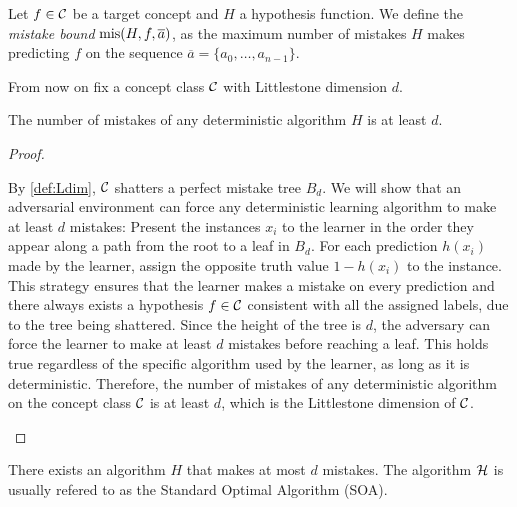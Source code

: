 \begin{definition}
    Let $f\in\mathcal{C}$ be a target concept and $H$ a hypothesis function. We define the \emph{mistake bound} $\operatorname{mis}(H,f,\overline{a})$, as the maximum number of mistakes $H$ makes predicting $f$ on the sequence $\overline{a}=\{a_0,\ldots,a_{n-1}\}$.
\end{definition}

From now on fix a concept class $\mathcal{C}$ with Littlestone dimension $d$.

\begin{theorem}
    \label{thm:LdimMistakes}
    The number of mistakes of any deterministic algorithm $H$ is at least $d$.
\end{theorem}

\begin{proof}
\begin{outline}
\0 By \cref{def:Ldim}, $\mathcal{C}$ shatters a perfect mistake tree $B_d$. We will show that an adversarial environment can force any deterministic learning algorithm to make at least $d$ mistakes:
    \1 Present the instances $x_i$ to the learner in the order they appear along a path from the root to a leaf in $B_d$.
    \1 For each prediction $h(x_i)$ made by the learner, assign the opposite truth value $1-h(x_i)$ to the instance.
\0 This strategy ensures that the learner makes a mistake on every prediction and there always exists a hypothesis $f \in \mathcal{C}$ consistent with all the assigned labels, due to the tree being shattered. 
Since the height of the tree is $d$, the adversary can force the learner to make at least $d$ mistakes before reaching a leaf. This holds true regardless of the specific algorithm used by the learner, as long as it is deterministic. Therefore, the number of mistakes of any deterministic algorithm on the concept class $\mathcal{C}$ is at least $d$, which is the Littlestone dimension of $\mathcal{C}$.
\end{outline}
\end{proof}

\begin{theorem}
    \label{thm:SOA}
    \item There exists an algorithm $H$ that makes at most $d$ mistakes. The algorithm $\mathcal{H}$ is usually refered to as the Standard Optimal Algorithm (SOA).
\end{theorem}

